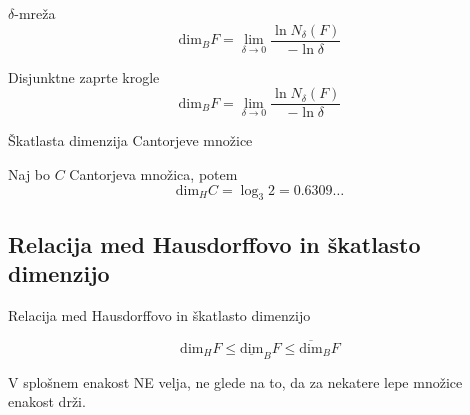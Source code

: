 \documentclass[10pt]{beamer}
\begin{document}

\begin{frame}[t]{\(\delta\)-mreža}  
    \[\text{dim}_B F = \lim_{\delta \to 0} \frac{\ln N_\delta(F)}{-\ln \delta}\]
    \begin{center}
        \scalebox{0.9}{
            \drawMesh
        }        
    \end{center}   
\end{frame}

\begin{frame}[t]{Disjunktne zaprte krogle}  
    \[\text{dim}_B F = \lim_{\delta \to 0} \frac{\ln N_\delta(F)}{-\ln \delta}\]
\end{frame}

\begin{frame}[t]{Škatlasta dimenzija Cantorjeve množice}  
    \begin{primer}
        Naj bo \(C\) Cantorjeva množica, potem 
        \[\text{dim}_H C = \log_3 2 = 0.6309\ldots\]
    \end{primer}
\end{frame}

\subsection{Relacija med Hausdorffovo in škatlasto dimenzijo}
\begin{frame}[t]{Relacija med Hausdorffovo in škatlasto dimenzijo}
    \begin{trditev}
        \[\text{dim}_H F \leq \underline{\text{dim}}_B F \leq \overline{\text{dim}}_B F\]
    \end{trditev}

    \pause
    \begin{opomba}
        V splošnem enakost NE velja, ne glede na to, da za nekatere lepe množice enakost drži.
    \end{opomba}
\end{frame}
\end{document}
